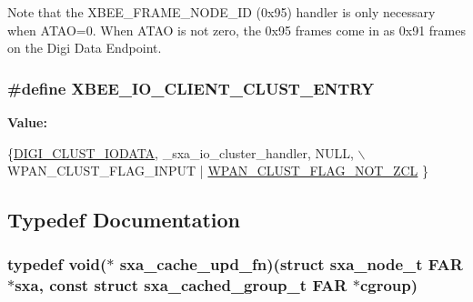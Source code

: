 Note that the X\-B\-E\-E\-\_\-\-F\-R\-A\-M\-E\-\_\-\-N\-O\-D\-E\-\_\-\-I\-D (0x95) handler is only necessary when A\-T\-A\-O=0. When A\-T\-A\-O is not zero, the 0x95 frames come in as 0x91 frames on the Digi Data Endpoint. \hypertarget{group___s_x_a_ga19c9d9c766179398cff4bf8b33f57ae9}{
\subsubsection[{X\-B\-E\-E\-\_\-\-I\-O\-\_\-\-C\-L\-I\-E\-N\-T\-\_\-\-C\-L\-U\-S\-T\-\_\-\-E\-N\-T\-R\-Y}]{\setlength{\rightskip}{0pt plus 5cm}\#define X\-B\-E\-E\-\_\-\-I\-O\-\_\-\-C\-L\-I\-E\-N\-T\-\_\-\-C\-L\-U\-S\-T\-\_\-\-E\-N\-T\-R\-Y}}\label{group___s_x_a_ga19c9d9c766179398cff4bf8b33f57ae9}
{\bfseries Value\-:}
\begin{DoxyCode}
\{\hyperlink{group__wpan__aps_gga1227ab13b41d82d9c9c9080662f74cf7a66527ddc0653858888ce47c469c95349}{DIGI\_CLUST\_IODATA}, \_sxa\_io\_cluster\_handler, NULL,  \(\backslash\)
         WPAN\_CLUST\_FLAG\_INPUT | \hyperlink{group__wpan__aps_gacb0e365a8c5e72ee90be503513e7e630}{WPAN\_CLUST\_FLAG\_NOT\_ZCL}
      \}
\end{DoxyCode}


\subsection{Typedef Documentation}
\hypertarget{group___s_x_a_ga33ed33d7f2ab515af37029d8b4b4f449}{
\subsubsection[{sxa\-\_\-cache\-\_\-upd\-\_\-fn}]{\setlength{\rightskip}{0pt plus 5cm}typedef void($\ast$ sxa\-\_\-cache\-\_\-upd\-\_\-fn)(struct {\bf sxa\-\_\-node\-\_\-t} {\bf F\-A\-R} $\ast$sxa, const struct {\bf sxa\-\_\-cached\-\_\-group\-\_\-t} {\bf F\-A\-R} $\ast$cgroup)}}\label{group___s_x_a_ga33ed33d7f2ab515af37029d8b4b4f449}



